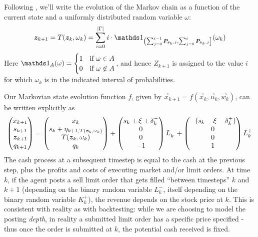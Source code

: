 Following \cite{Kwong15}, we'll write the evolution of the Markov chain as a function of the current state and a uniformly distributed random variable $\omega$:
\begin{equation}
\bz_{k+1} = T(\bz_k, \omega_k) = \sum_{i=0}^{|\Gamma|} i \cdot \indicator_{\left( \sum_{j=0}^{i-1} \bP_{\bz_k,j} , \sum_{j=0}^{i} \bP_{\bz_k,j} \right]} (\omega_k)
\end{equation}
Here $\indicator_A(\omega) = \begin{cases} 1 & \text{if } \omega \in A \\
0 & \text{if } \omega \not\in A
\end{cases}$, and hence $Z_{k+1}$ is assigned to the value $i$ for which $\omega_k$ is in the indicated interval of probabilities.

Our Markovian state evolution function $f$, given by $\vec{x}_{k+1} = f \left( \vec{x}_{k},\vec{u}_{k}, \vec{w}_{k} \right)$, can be written explicitly as
\begin{equation}\label{eq:discretestateevolution}
\begin{pmatrix}
x_{k+1} \\
s_{k+1} \\
\bm{z}_{k+1} \\
q_{k+1} 
\end{pmatrix} = \begin{pmatrix}
x_k \\
s_{k} + \eta_{k+1,T(\bm{z}_k, \omega_k)} \\
T(\bm{z}_k, \omega_k) \\
q_{k}
\end{pmatrix}
+ \begin{pmatrix}
s_k + \xi + \delta_k^- \\
0 \\
0 \\
-1
\end{pmatrix}L_k^-
+ \begin{pmatrix}
- (s_k - \xi - \delta_k^+) \\
0 \\
0 \\
1
\end{pmatrix} L_k^+
\end{equation}
The cash process at a subsequent timestep is equal to the cash at the previous step, plus the profits and costs of executing market and/or limit orders. At time $k$, if the agent posts a sell limit order that gets filled ``between timesteps'' $k$ and $k+1$ (depending on the binary random variable $L_k^-$, itself depending on the binary random variable $K_k^+$), the revenue depends on the stock price at $k$. This is consistent with reality as with backtesting: while we are choosing to model the posting \textit{depth}, in reality a submitted limit order has a specific price specified - thus once the order is submitted at $k$, the potential cash received is fixed. 

